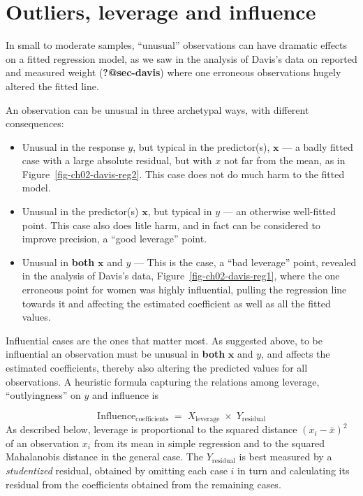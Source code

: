 \documentclass[
  letterpaper,
  10pt,
  krantz2]{krantz}
\begin{document}
\hypertarget{sec-leverage}{%
\section{Outliers, leverage and influence}\label{sec-leverage}}

In small to moderate samples, ``unusual'' observations can have dramatic
effects on a fitted regression model, as we saw in the analysis of
Davis's data on reported and measured weight (\textbf{?@sec-davis})
where one erroneous observations hugely altered the fitted line.

An observation can be unusual in three archetypal ways, with different
consequences:

\begin{itemize}
\item
  Unusual in the response \(y\), but typical in the predictor(s),
  \(\mathbf{x}\) --- a badly fitted case with a large absolute residual,
  but with \(x\) not far from the mean, as in
  Figure~\ref{fig-ch02-davis-reg2}. This case does not do much harm to
  the fitted model.
\item
  Unusual in the predictor(s) \(\mathbf{x}\), but typical in \(y\) ---
  an otherwise well-fitted point. This case also does litle harm, and in
  fact can be considered to improve precision, a ``good leverage''
  point.
\item
  Unusual in \textbf{both} \(\mathbf{x}\) and \(y\) --- This is the
  case, a ``bad leverage'' point, revealed in the analysis of Davis's
  data, Figure~\ref{fig-ch02-davis-reg1}, where the one erroneous point
  for women was highly influential, pulling the regression line towards
  it and affecting the estimated coefficient as well as all the fitted
  values.
\end{itemize}

Influential cases are the ones that matter most. As suggested above, to
be influential an observation must be unusual in \textbf{both}
\(\mathbf{x}\) and \(y\), and affects the estimated coefficients,
thereby also altering the predicted values for all observations. A
heuristic formula capturing the relations among leverage,
``outlyingness'' on \(y\) and influence is

\[
\text{Influence}_{\text{coefficients}} \;=\; X_\text{leverage} \;\times\; Y_\text{residual}
\] As described below, leverage is proportional to the squared distance
\((x_i - \bar{x})^2\) of an observation \(x_i\) from its mean in simple
regression and to the squared Mahalanobis distance in the general case.
The \(Y_\text{residual}\) is best measured by a \emph{studentized}
residual, obtained by omitting each case \(i\) in turn and calculating
its residual from the coefficients obtained from the remaining cases.
\end{document}

